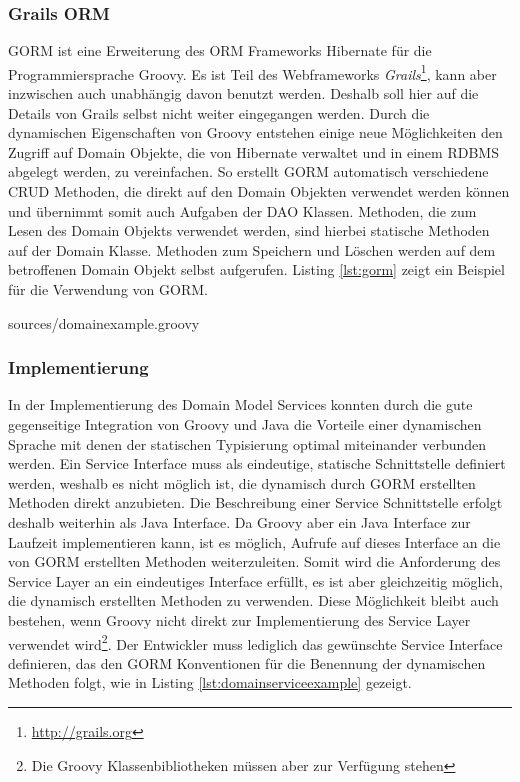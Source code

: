 \subsubsection{Grails ORM}
\ac{GORM} ist eine Erweiterung des \ac{ORM} Frameworks Hibernate für die
Programmiersprache Groovy. Es ist Teil des Webframeworks
\emph{Grails}\footnote{\url{http://grails.org}}, kann aber inzwischen auch
unabhängig davon benutzt werden. Deshalb soll hier auf die Details von Grails
selbst nicht weiter eingegangen werden. Durch die dynamischen Eigenschaften von
Groovy entstehen einige neue Möglichkeiten den Zugriff auf Domain Objekte, die
von Hibernate verwaltet und in einem \ac{RDBMS} abgelegt werden, zu vereinfachen.
So erstellt \ac{GORM} automatisch verschiedene \ac{CRUD} Methoden, die direkt auf
den Domain Objekten verwendet werden können und übernimmt somit auch Aufgaben der
\ac{DAO} Klassen. Methoden, die zum Lesen des Domain Objekts verwendet werden,
sind hierbei statische Methoden auf der Domain Klasse. Methoden zum Speichern und
Löschen werden auf dem betroffenen Domain Objekt selbst aufgerufen. Listing
\ref{lst:gorm} zeigt ein Beispiel für die Verwendung von \ac{GORM}.

\lstset{language=Java}

{sources/domainexample.groovy}
 
\subsubsection{Implementierung}
In der Implementierung des Domain Model Services konnten durch die gute
gegenseitige Integration von Groovy und Java die Vorteile einer dynamischen
Sprache mit denen der statischen Typisierung optimal miteinander verbunden
werden. Ein Service Interface muss als eindeutige, statische Schnittstelle
definiert werden, weshalb es nicht möglich ist, die dynamisch durch \ac{GORM}
erstellten Methoden direkt anzubieten. Die Beschreibung einer Service
Schnittstelle erfolgt deshalb weiterhin als Java Interface. Da Groovy aber ein
Java Interface zur Laufzeit implementieren kann, ist es möglich, Aufrufe auf
dieses Interface an die von \ac{GORM} erstellten Methoden weiterzuleiten. Somit
wird die Anforderung des Service Layer an ein eindeutiges Interface erfüllt, es
ist aber gleichzeitig möglich, die dynamisch erstellten Methoden zu verwenden.
Diese Möglichkeit bleibt auch bestehen, wenn Groovy nicht direkt zur
Implementierung des Service Layer verwendet wird\footnote{Die Groovy
Klassenbibliotheken müssen aber zur Verfügung stehen}. Der Entwickler muss
lediglich das gewünschte Service Interface definieren, das den \ac{GORM}
Konventionen für die Benennung der dynamischen Methoden folgt, wie in Listing
\ref{lst:domainserviceexample} gezeigt.

